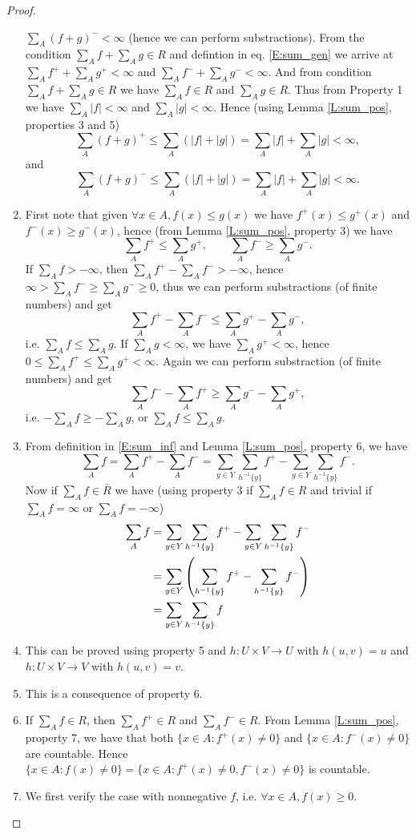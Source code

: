 \begin{proof}
\begin{enumerate}
  $\sum_A (f+g)^-<\infty$ (hence we can perform substractions). From the
  condition $\sum_A f+\sum_A g\in R$ and defintion in eq. \ref{E:sum_gen} we 
  arrive at $\sum_A f^++\sum_A g^+<\infty$ and $\sum_A f^-+\sum_A g^-<\infty$. 
  And from condition $\sum_A f+\sum_A g\in R$ we have $\sum_A f\in R$ and
  $\sum_A g\in R$. Thus from Property 1 we have $\sum_A |f|<\infty$ and 
  $\sum_A |g|<\infty$. Hence (using Lemma \ref{L:sum_pos}, properties 3 and 5)
  \[
    \sum_A (f+g)^+ \leq \sum_A (|f|+|g|) =\sum_A |f| +\sum_A |g| <\infty,
  \]
  and
  \[
    \sum_A (f+g)^- \leq \sum_A (|f|+|g|) =\sum_A |f| +\sum_A |g| <\infty.
  \]
\item First note that given $\forall x\in A, f(x)\leq g(x)$ we have
$f^+(x)\leq g^+(x)$ and $f^-(x)\geq g^-(x)$, hence (from Lemma \ref{L:sum_pos},
property 3) we have
\[
  \sum_A f^+\leq \sum_A g^+, \qquad \sum_A f^-\geq \sum_A g^-.
\]
If $\sum_A f>-\infty$, then $\sum_A f^+ -\sum_A f^->-\infty$, hence
$\infty>\sum_A f^-\geq \sum_A g^- \geq 0$, thus we can perform substractions
(of finite numbers) and get
\[
  \sum_A f^+ -\sum_A f^- \leq \sum_A g^+ -\sum_A g^-,
\]
i.e. $\sum_A f\leq \sum_A g$.
If $\sum_A g<\infty$, we have $\sum_A g^+<\infty$, hence
$0\leq \sum_A f^+ \leq \sum_A g^+ <\infty$. Again we can perform
substraction (of finite numbers) and get
\[
  \sum_A f^- -\sum_A f^+ \geq \sum_A g^- -\sum_A g^+,
\]
i.e. $-\sum_A f\geq -\sum_A g$, or $\sum_A f\leq \sum_A g$.
\item From definition in \ref{E:sum_inf} and Lemma \ref{L:sum_pos}, property 6,
  we have
  \[
    \sum_A f=\sum_A f^+ -\sum_A f^-
      = \sum_{y\in Y} \sum_{h^{-1}\{y\}} f^+ 
        - \sum_{y\in Y} \sum_{h^{-1}\{y\}} f^-.
  \]
  Now if $\sum_A f\in \bar{R}$ we have (using property 3 if $\sum_A f\in R$
  and trivial if $\sum_A f=\infty$ or $\sum_A f=-\infty$)
  \begin{align*} 
    \sum_A f
      &= \sum_{y\in Y} \sum_{h^{-1}\{y\}} f^+ 
        - \sum_{y\in Y} \sum_{h^{-1}\{y\}} f^- \notag \\
      &= \sum_{y\in Y} 
           \left( 
             \sum_{h^{-1}\{y\}} f^+ -\sum_{h^{-1}\{y\}} f^- 
           \right) \notag \\
      &= \sum_{y\in Y} \sum_{h^{-1}\{y\}} f \notag \\
  \end{align*} 
\item This can be proved using property 5 and $h:U\times V\rightarrow U$ with
$h(u,v)=u$ and $h:U\times V\rightarrow V$ with $h(u,v)=v$.
\item This is a consequence of property 6.
\item If $\sum_A f\in R$, then $\sum_A f^+\in R$ and $\sum_A f^-\in R$. From
Lemma \ref{L:sum_pos}, property 7, we have that both 
$\{x\in A:f^+(x)\ne 0\}$ and $\{x\in A:f^-(x)\ne 0\}$ are countable. Hence
$\{x\in A:f(x)\ne 0\}=\{x\in A:f^+(x)\ne 0, f^-(x)\ne 0\}$ is countable.
\item We first verify the case with nonnegative $f$, i.e. 
  $\forall x\in A, f(x)\ge 0$. 


\end{enumerate}
\end{proof}
